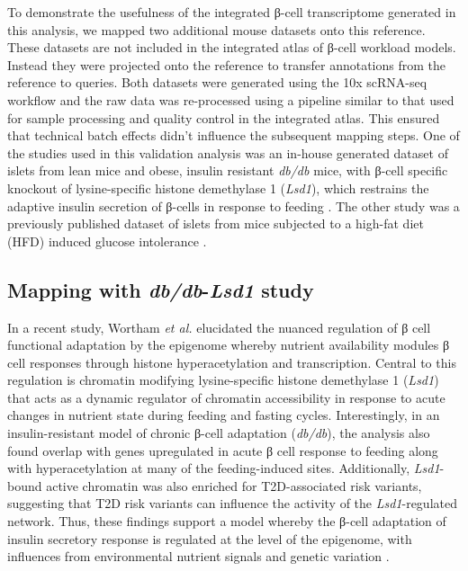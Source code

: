 To demonstrate the usefulness of the integrated β-cell transcriptome generated in this analysis, we mapped two additional mouse datasets onto this reference. These datasets are not included in the integrated atlas of β-cell workload models. Instead they were projected onto the reference to transfer annotations from the reference to  queries. Both datasets were generated using the 10x scRNA-seq workflow and the raw data was re-processed using a pipeline similar to that used for sample processing and quality control in the integrated atlas. This ensured that technical batch effects didn't influence the subsequent mapping steps. One of the studies used in this validation analysis was an in-house generated dataset of islets from lean mice and obese, insulin resistant \textit{db/db} mice, with β-cell specific knockout of lysine-specific histone demethylase 1 (\textit{Lsd1}), which restrains the adaptive insulin secretion of β-cells in response to feeding \textbf{\cite{wortham_nutrient_2023}}. The other study was a previously published dataset of islets from mice subjected to a high-fat diet (HFD) induced glucose intolerance \textbf{\cite{fu_single-cell_2023}}.

\subsection{Mapping with \textit{db/db}-\textit{Lsd1} study}

In a recent study, Wortham \textit{et al.} elucidated the nuanced regulation of β cell functional adaptation by the epigenome whereby nutrient availability modules β cell responses through histone hyperacetylation and transcription. Central to this regulation is chromatin modifying lysine-specific histone demethylase 1 (\textit{Lsd1}) that acts as a dynamic regulator of chromatin accessibility in response to acute changes in nutrient state during feeding and fasting cycles. Interestingly, in an insulin-resistant model of chronic β-cell adaptation (\textit{db/db}), the analysis also found overlap with genes upregulated in acute β cell response to feeding along with hyperacetylation at many of the feeding-induced sites. Additionally, \textit{Lsd1}-bound active chromatin was also enriched for T2D-associated risk variants, suggesting that T2D risk variants can influence the activity of the \textit{Lsd1}-regulated network. Thus, these findings support a model whereby the β-cell adaptation of insulin secretory response is regulated at the level of the epigenome, with influences from environmental nutrient signals and genetic variation \textbf{\cite{wortham_nutrient_2023,aamodt_peeling_2023}}.\\

